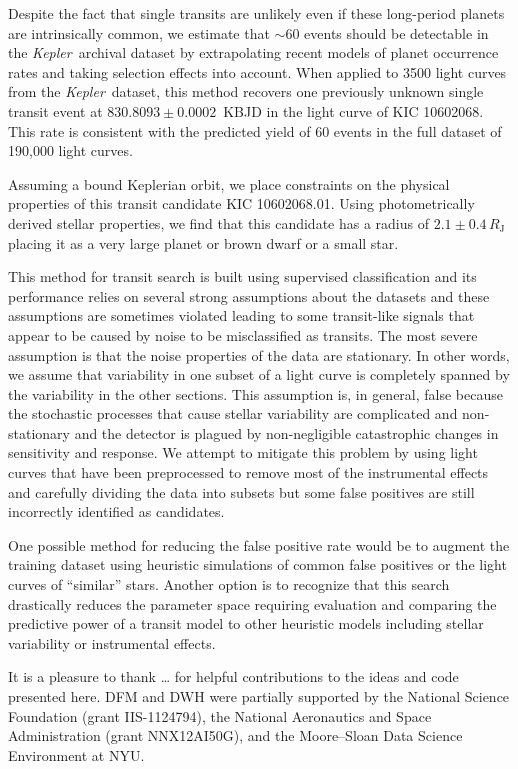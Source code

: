 \documentclass[12pt,preprint]{aastex}
\newcommand{\project}[1]{\textsl{#1}}
\newcommand{\kepler}{\project{Kepler}}
\begin{document}
Despite the fact that single transits are unlikely even if these long-period
planets are intrinsically common, we estimate that $\sim 60$ events should be
detectable in the \kepler\ archival dataset by extrapolating recent models of
planet occurrence rates and taking selection effects into account.
When applied to 3500 light curves from the \kepler\ dataset, this method
recovers one previously unknown single transit event at
$830.8093\pm0.0002$~KBJD in the light curve of KIC 10602068.
This rate is consistent with the predicted yield of 60 events in the full
dataset of 190,000 light curves.

Assuming a bound Keplerian orbit, we place constraints on the physical
properties of this transit candidate KIC 10602068.01.
Using photometrically derived stellar properties, we find that this candidate
has a radius of $2.1 \pm 0.4\,R_\mathrm{J}$ placing it as a very large planet
or brown dwarf or a small star.

This method for transit search is built using supervised classification and
its performance relies on several strong assumptions about the datasets and
these assumptions are sometimes violated leading to some transit-like signals
that appear to be caused by noise to be misclassified as transits.
The most severe assumption is that the noise properties of the data are
stationary.
In other words, we assume that variability in one subset of a light curve is
completely spanned by the variability in the other sections.
This assumption is, in general, false because the stochastic processes that
cause stellar variability are complicated and non-stationary and the detector
is plagued by non-negligible catastrophic changes in sensitivity and response.
We attempt to mitigate this problem by using light curves that have been
preprocessed to remove most of the instrumental effects and carefully dividing
the data into subsets but some false positives are still incorrectly
identified as candidates.

One possible method for reducing the false positive rate would be to augment
the training dataset using heuristic simulations of common false positives or
the light curves of ``similar'' stars.
Another option is to recognize that this search drastically reduces the
parameter space requiring evaluation and comparing the predictive power of
a transit model to other heuristic models including stellar variability or
instrumental effects.


\acknowledgments
It is a pleasure to thank
\ldots
for helpful contributions to the ideas and code presented here.
DFM and DWH were partially supported by the National Science Foundation
(grant IIS-1124794),
the National Aeronautics and Space Administration
(grant NNX12AI50G), and the Moore--Sloan Data Science Environment at NYU.
\end{document}

